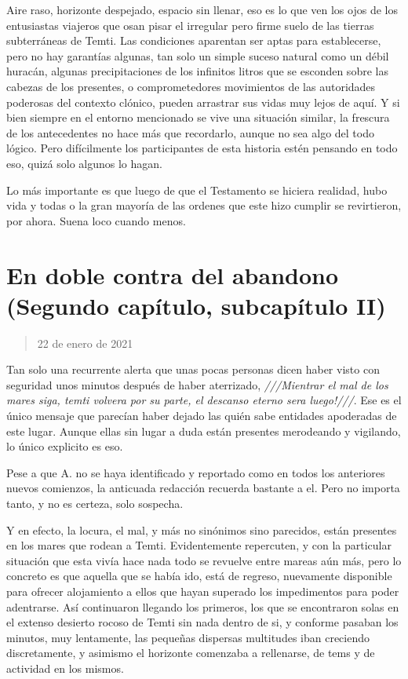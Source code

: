\documentclass[
  spanish,
]{book}
\begin{document}
Aire raso, horizonte despejado, espacio sin llenar, eso es lo que ven los ojos de los entusiastas viajeros que osan pisar el irregular pero firme suelo de las tierras subterráneas de Temti. Las condiciones aparentan ser aptas para establecerse, pero no hay garantías algunas, tan solo un simple suceso natural como un débil huracán, algunas precipitaciones de los infinitos litros que se esconden sobre las cabezas de los presentes, o comprometedores movimientos de las autoridades poderosas del contexto clónico, pueden arrastrar sus vidas muy lejos de aquí. Y si bien siempre en el entorno mencionado se vive una situación similar, la frescura de los antecedentes no hace más que recordarlo, aunque no sea algo del todo lógico. Pero difícilmente los participantes de esta historia estén pensando en todo eso, quizá solo algunos lo hagan.

Lo más importante es que luego de que el Testamento se hiciera realidad, hubo vida y todas o la gran mayoría de las ordenes que este hizo cumplir se revirtieron, por ahora. Suena loco cuando menos.

\hypertarget{en-doble-contra-del-abandono-segundo-capuxedtulo-subcapuxedtulo-ii}{%
\section{En doble contra del abandono (Segundo capítulo, subcapítulo II)}\label{en-doble-contra-del-abandono-segundo-capuxedtulo-subcapuxedtulo-ii}}

\begin{quote}
22 de enero de 2021
\end{quote}

Tan solo una recurrente alerta que unas pocas personas dicen haber visto con seguridad unos minutos después de haber aterrizado, \emph{///Mientrar el mal de los mares siga, temti volvera por su parte, el descanso eterno sera luego!///}. Ese es el único mensaje que parecían haber dejado las quién sabe entidades apoderadas de este lugar. Aunque ellas sin lugar a duda están presentes merodeando y vigilando, lo único explicito es eso.

Pese a que A. no se haya identificado y reportado como en todos los anteriores nuevos comienzos, la anticuada redacción recuerda bastante a el. Pero no importa tanto, y no es certeza, solo sospecha.

Y en efecto, la locura, el mal, y más no sinónimos sino parecidos, están presentes en los mares que rodean a Temti. Evidentemente repercuten, y con la particular situación que esta vivía hace nada todo se revuelve entre mareas aún más, pero lo concreto es que aquella que se había ido, está de regreso, nuevamente disponible para ofrecer alojamiento a ellos que hayan superado los impedimentos para poder adentrarse. Así continuaron llegando los primeros, los que se encontraron solas en el extenso desierto rocoso de Temti sin nada dentro de si, y conforme pasaban los minutos, muy lentamente, las pequeñas dispersas multitudes iban creciendo discretamente, y asimismo el horizonte comenzaba a rellenarse, de tems y de actividad en los mismos.
\end{document}
